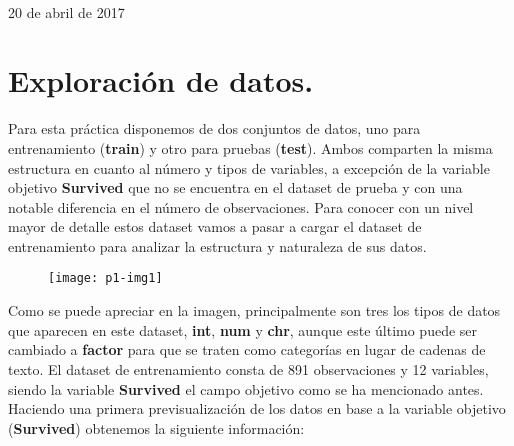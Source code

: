 \documentclass[10pt]{article}
\begin{document}
\begin{center}
 		\\																		%
\vspace{2cm} 																				
\begin{center}																					
{\large 20 de abril de 2017}																	%
 			\end{center}												  						
\end{center}							 											
																					
\newpage																		

\tableofcontents 

\newpage



\section{Exploración de datos.} 
Para esta práctica disponemos de dos conjuntos de datos, uno para entrenamiento (\textbf{train}) y otro para pruebas (\textbf{test}). Ambos comparten la misma estructura en cuanto al número y tipos de variables, a excepción de la variable objetivo \textbf{Survived} que no se encuentra en el dataset de prueba y con una notable diferencia en el número de observaciones. Para conocer con un nivel mayor de detalle estos dataset vamos a pasar a cargar el dataset de entrenamiento para analizar la estructura y naturaleza de sus datos.\\


\begin{figure}[H]
	\begin{center}
 		\texttt{[image: p1-img1]}
	\end{center} 
\end{figure}


Como se puede apreciar en la imagen, principalmente son tres los tipos de datos que aparecen en este dataset, \textbf{int}, \textbf{num} y \textbf{chr}, aunque este último puede ser cambiado a \textbf{factor} para que se traten como categorías en lugar de cadenas de texto. El dataset de entrenamiento consta de 891 observaciones y 12 variables, siendo la variable \textbf{Survived} el campo objetivo como se ha mencionado antes.\\

Haciendo una primera previsualización de los datos en base a la variable objetivo (\textbf{Survived}) obtenemos la siguiente información:\\
\end{document}
